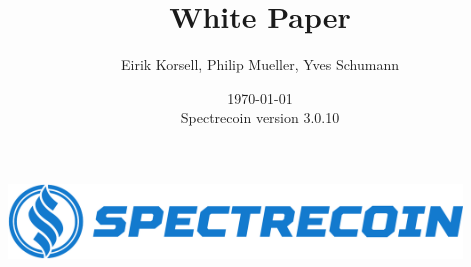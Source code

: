 \documentclass[a4paper,12pt]{article}
\title{White Paper}
\author{Eirik Korsell, Philip Mueller, Yves Schumann}
\date{\today \\
	Spectrecoin version 3.0.10}
\begin{document}
\begin{titlingpage} %
\begin{center}
\includegraphics[height=2cm]{Images/Headline.png}\\ %
\vspace{4cm} %
\begin{huge} 
\textbf{\thetitle} \\
\end{huge}
\theauthor\\
\vspace{7cm} %
\thedate
\end{center}
\end{titlingpage}

\sffamily

\begin{spacing}{0}
    \tableofcontents
\end{spacing}

\setlength{\arrayrulewidth}{.5mm}
\setlength{\tabcolsep}{8pt}
\renewcommand{\arraystretch}{1.5}
















\end{document}
